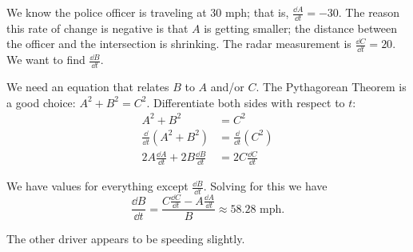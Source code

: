 \begin{example}
We know the police officer is traveling at 30 mph; that is, $\frac{\dd A}{\dd t} = -30$. The reason this rate of change is negative is that $A$ is getting smaller; the distance between the officer and the intersection is shrinking. The radar measurement is $\frac{\dd C}{\dd t} = 20$. We want to find $\frac{\dd B}{\dd t}$. 

We need an equation that relates $B$ to $A$ and/or $C$. The Pythagorean Theorem is a good choice: $A^2+B^2 = C^2$. Differentiate both sides with respect to $t$:
\begin{align*}
	A^2 + B^2 &= C^2 \\
	\frac{\dd}{\dd t}\left(A^2+B^2\right) &= \frac{\dd}{\dd t}\left(C^2\right) \\
	2A\frac{\dd A}{\dd t} + 2B\frac{\dd B}{\dd t} &= 2C\frac{\dd C}{\dd t}
\end{align*}


We have values for everything except $\frac{\dd B}{\dd t}$. Solving for this we have 
\[
\frac{\dd B}{\dd t} = \frac{C\frac{\dd C}{\dd t}- A\frac{\dd A}{\dd t}}{B} \approx 58.28\text{ mph}.
\]
		
The other driver appears to be speeding slightly.	
\end{example}

